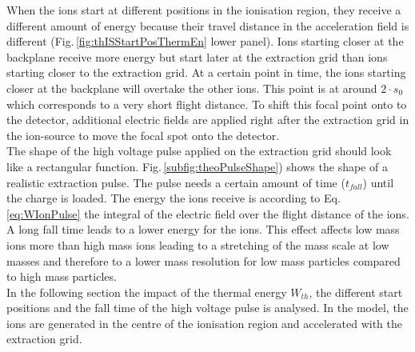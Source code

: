 	When the ions start at different positions in the ionisation region, they receive a different amount of energy because their travel distance in the acceleration field is different (Fig.\,\ref{fig:thISStartPosThermEn} lower panel). Ions starting closer at the backplane receive more energy but start later at the extraction grid than ions starting closer to the extraction grid. At a certain point in time, the ions starting closer at the backplane will overtake the other ions. This point is at around $2\cdot s_0$ which corresponds to a very short flight distance. To shift this focal point onto to the detector, additional electric fields are applied right after the extraction grid in the ion-source to move the focal spot onto the detector.\\ %
	
	 The shape of the high voltage pulse applied on the extraction grid should look like a rectangular function. Fig.\,\ref{subfig:theoPulseShape}) shows the shape of a realistic extraction pulse. The pulse needs a certain amount of time ($t_{fall}$) until the charge is loaded. The energy the ions receive is according to Eq.\,\eqref{eq:WIonPulse} the integral of the electric field over the flight distance of the ions. A long fall time leads to a lower energy for the ions. This effect affects low mass ions more than high mass ions leading to a stretching of the mass scale at low masses and therefore to a lower mass resolution for low mass particles compared to high mass particles.\\
	
	In the following section the impact of the thermal energy $W_{th}$, the different start positions and the fall time of the high voltage pulse is analysed. In the model, the ions are generated in the centre of the ionisation region and accelerated with the extraction grid.\\
	
